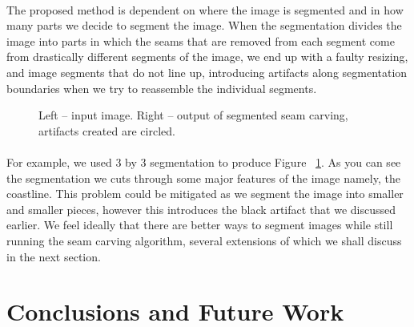 \documentclass[conference]{acmsiggraph}
\begin{document}
\paragraph{}
The proposed method is dependent on where the image is segmented and in how many parts we decide to segment the image. When the segmentation divides the image into parts in which the seams that are removed from each segment come from drastically different segments of the image, we end up with a faulty resizing, and image segments that do not line up, introducing artifacts along segmentation boundaries when we try to reassemble the individual segments. 
\begin{figure}[ht]
    \caption{Left -- input image. Right -- output of segmented seam carving, artifacts created are circled.}
    \label{fig:Beach_in_and_out}
\end{figure}
\paragraph{}
For example, we used 3 by 3 segmentation to produce Figure ~\ref{fig:Beach_in_and_out}.  As you can see the segmentation we cuts through some major features of the image namely, the coastline.  This problem could be mitigated as we segment the image into smaller and smaller pieces, however this introduces the black artifact that we discussed earlier.  We feel ideally that there are better ways to segment images while still running the seam carving algorithm, several extensions of which we shall discuss in the next section.  


\section{Conclusions and Future Work}
\end{document}
